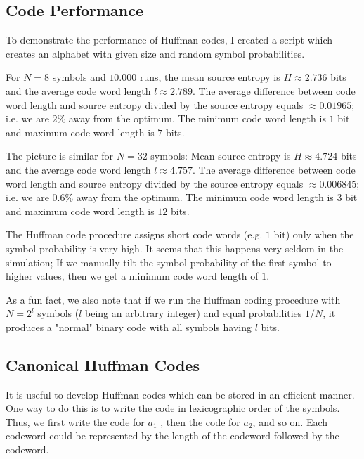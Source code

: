 
\subsection{Code Performance}

To demonstrate the performance of Huffman codes, I created a script which creates an alphabet with given size and random symbol probabilities. 

For $N = 8$ symbols and $10.000$ runs, the mean source entropy is $H \approx 2.736$ bits and the average code word length $l \approx 2.789$. The average difference between code word length and source entropy divided by the source entropy equals $\approx 0.01965$; i.e. we are $2\%$ away from the optimum. The minimum code word length is $1$ bit and maximum code word length is $7$ bits.

The picture is similar for $N = 32$ symbols: Mean source entropy is $H \approx 4.724$ bits and the average code word length $l \approx 4.757$. The average difference between code word length and source entropy divided by the source entropy equals $\approx 0.006845$; i.e. we are $0.6\%$ away from the optimum. The minimum code word length is $3$ bit and maximum code word length is $12$ bits.

The Huffman code procedure assigns short code words (e.g. $1$ bit) only when the symbol probability is very high. It seems that this happens very seldom in the simulation; If we manually tilt the symbol probability of the first symbol to higher values, then we get a minimum code word length of $1$.

As a fun fact, we also note that if we run the Huffman coding procedure with $N = 2^l$ symbols ($l$ being an arbitrary integer) and equal probabilities $1/N$, it produces a "normal" binary code with all symbols having $l$ bits.



\subsection{Canonical Huffman Codes}

It is useful to develop Huffman codes which can be stored in an efficient manner. One way to do this is to write the code in lexicographic order of the symbols. Thus, we first write the code for $a_1$ , then the code for $a_2$, and so on. Each codeword could be represented by the length of the codeword followed by the codeword. 

